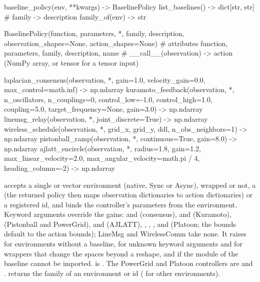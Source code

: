 \begin{pycode}
baseline_policy(env, **kwargs) -> BaselinePolicy
list_baselines() -> dict[str, str]        # family -> description
family_of(env) -> str

BaselinePolicy(function, parameters, *, family, description,
               observation_shapes=None, action_shapes=None)
    # attributes function, parameters, family, description, name
    # __call__(observation) -> action (NumPy array, or tensor for a tensor input)

laplacian_consensus(observation, *, gain=1.0, velocity_gain=0.0,
                    max_control=math.inf) -> np.ndarray
kuramoto_feedback(observation, *, n_oscillators, n_couplings=0,
                  control_low=-1.0, control_high=1.0, coupling=5.0,
                  target_frequency=None, gain=3.0) -> np.ndarray
linemsg_relay(observation, *, joint_discrete=True) -> np.ndarray
wireless_schedule(observation, *, grid_x, grid_y, ddl,
                  n_obs_neighbors=1) -> np.ndarray
pistonball_ramp(observation, *, continuous=True, gain=8.0) -> np.ndarray
ajlatt_encircle(observation, *, radius=1.8, gain=1.2, max_linear_velocity=2.0,
                max_angular_velocity=math.pi / 4,
                heading_column=-2) -> np.ndarray
\end{pycode}

 accepts a single or vector environment (native, Sync
or Async), wrapped or not, a  (the returned policy
then maps observation dictionaries to action dictionaries) or a registered id,
and binds the controller's parameters from the environment. Keyword arguments
override the gains:  and  (consensus),
 and  (Kuramoto),  (Pistonball and
PowerGrid),  and  (AJLATT), , ,
,  and  (Platoon; the bounds
default to the action bounds); LineMsg and WirelessComm take none. It raises
 for environments without a baseline, for unknown keyword
arguments and for wrappers that change the spaces beyond a reshape, and
 if the module of the baseline cannot be imported.
 is . The PowerGrid and
Platoon controllers are  and
.  returns the family
of an environment or id ( for other environments).

